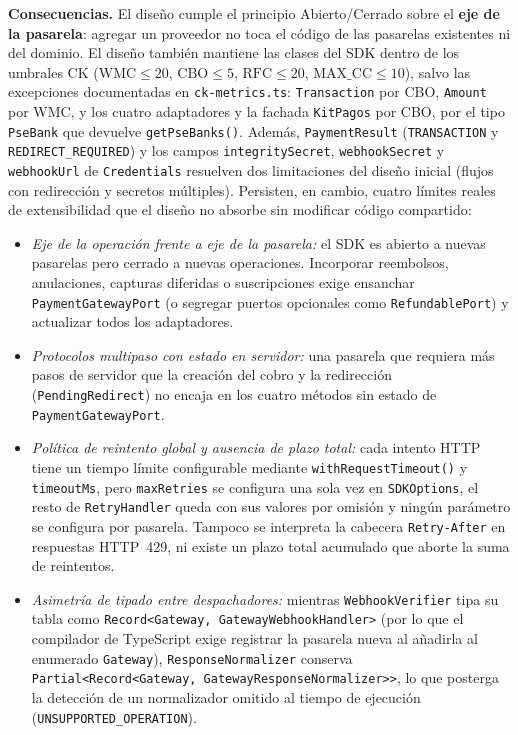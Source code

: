\textbf{Consecuencias.} El diseño cumple el principio Abierto/Cerrado sobre el \textbf{eje de la pasarela}: agregar un proveedor no toca el código de las pasarelas existentes ni del dominio. El diseño también mantiene las clases del SDK dentro de los umbrales CK ($\mathrm{WMC} \le 20$, $\mathrm{CBO} \le 5$, $\mathrm{RFC} \le 20$, $\mathrm{MAX\_CC} \le 10$), salvo las excepciones documentadas en \texttt{ck-metrics.ts}: \texttt{Transaction} por CBO, \texttt{Amount} por WMC, y los cuatro adaptadores y la fachada \texttt{KitPagos} por CBO, por el tipo \texttt{PseBank} que devuelve \texttt{getPseBanks()}. Además, \texttt{PaymentResult} (\texttt{TRANSACTION} y \texttt{REDIRECT\_REQUIRED}) y los campos \texttt{integritySecret}, \texttt{webhookSecret} y \texttt{webhookUrl} de \texttt{Credentials} resuelven dos limitaciones del diseño inicial (flujos con redirección y secretos múltiples). Persisten, en cambio, cuatro límites reales de extensibilidad que el diseño no absorbe sin modificar código compartido:
\begin{itemize}
  \item \textit{Eje de la operación frente a eje de la pasarela:} el SDK es abierto a nuevas pasarelas pero cerrado a nuevas operaciones. Incorporar reembolsos, anulaciones, capturas diferidas o suscripciones exige ensanchar \texttt{PaymentGatewayPort} (o segregar puertos opcionales como \texttt{RefundablePort}) y actualizar todos los adaptadores.
  \item \textit{Protocolos multipaso con estado en servidor:} una pasarela que requiera más pasos de servidor que la creación del cobro y la redirección (\texttt{PendingRedirect}) no encaja en los cuatro métodos sin estado de \texttt{PaymentGatewayPort}.
  \item \textit{Política de reintento global y ausencia de plazo total:} cada intento HTTP tiene un tiempo límite configurable mediante \texttt{withRequestTimeout()} y \texttt{timeoutMs}, pero \texttt{maxRetries} se configura una sola vez en \texttt{SDKOptions}, el resto de \texttt{RetryHandler} queda con sus valores por omisión y ningún parámetro se configura por pasarela. Tampoco se interpreta la cabecera \texttt{Retry-After} en respuestas HTTP~429, ni existe un plazo total acumulado que aborte la suma de reintentos.
  \item \textit{Asimetría de tipado entre despachadores:} mientras \texttt{WebhookVerifier} tipa su tabla como \texttt{Record<Gateway, GatewayWebhookHandler>} (por lo que el compilador de TypeScript exige registrar la pasarela nueva al añadirla al enumerado \texttt{Gateway}), \texttt{ResponseNormalizer} conserva \texttt{Partial<Record<Gateway, GatewayResponseNormalizer>>}, lo que posterga la detección de un normalizador omitido al tiempo de ejecución (\texttt{UNSUPPORTED\_OPERATION}).
\end{itemize}

